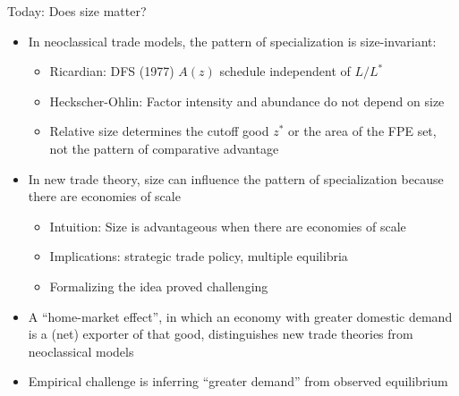 \documentclass[11pt,notes=hide,aspectratio=169]{beamer}
\begin{document}
\begin{frame}{Today: Does size matter?}
\linespread{1.1}
\begin{itemize}
	\item In neoclassical trade models, the pattern of specialization is size-invariant:
	\begin{itemize}
		\item Ricardian: DFS (1977) $A(z)$ schedule independent of $L/L^{*}$
		\item Heckscher-Ohlin: Factor intensity and abundance do not depend on size 
		\item Relative size determines the cutoff good $z^{*}$ or the area of the FPE set, not the pattern of comparative advantage
	\end{itemize}
	\item In new trade theory, size can influence the pattern of specialization because there are economies of scale
\begin{itemize}
	\item Intuition: Size is advantageous when there are economies of scale
	\item Implications: strategic trade policy, multiple equilibria
	\item Formalizing the idea proved challenging
\end{itemize}
	\item A ``home-market effect'', in which an economy with greater domestic demand is a (net) exporter of that good, distinguishes new trade theories from neoclassical models
	\item Empirical challenge is inferring ``greater demand'' from observed equilibrium
\end{itemize}
\end{frame}
\end{document}
